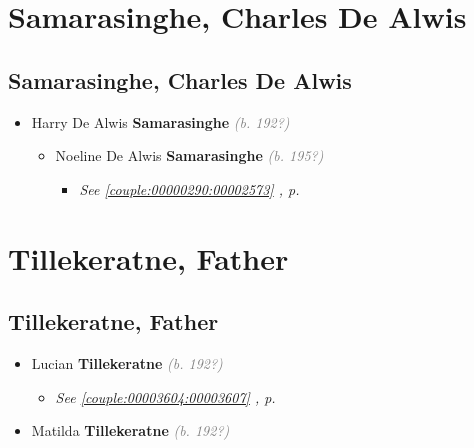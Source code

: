 \documentclass[10pt, openany]{book}
\begin{document}
\part{Samarasinghe, Charles De Alwis}
\chapter{Samarasinghe, Charles De Alwis}
\label{00002580}
\textcolor{slmaroon}{\textit{}}
\begin{itemize}
\item{Harry De Alwis \textbf{Samarasinghe} \textcolor{gray}{\textit{(b. 192?)}}
\begin{itemize}
\item{Noeline De Alwis \textbf{Samarasinghe} \textcolor{gray}{\textit{(b. 195?)}}
\begin{itemize}
\item{\textcolor{slteal}{\textit{See  \autoref{couple:00000290:00002573} \textit{, p. \pageref{couple:00000290:00002573} }}}}
\end{itemize}
   }
\end{itemize}
   }
\end{itemize}
   
\part{Tillekeratne, Father}
\chapter{Tillekeratne, Father}
\label{00003611}
\textcolor{slmaroon}{\textit{}}
\begin{itemize}
\item{Lucian \textbf{Tillekeratne} \textcolor{gray}{\textit{(b. 192?)}}
\begin{itemize}
\item{\textcolor{slteal}{\textit{See  \autoref{couple:00003604:00003607} \textit{, p. \pageref{couple:00003604:00003607} }}}}
\end{itemize}
 }
\item{Matilda  \textbf{Tillekeratne} \textcolor{gray}{\textit{(b. 192?)}}
  }
\end{itemize}
 
\end{document}
